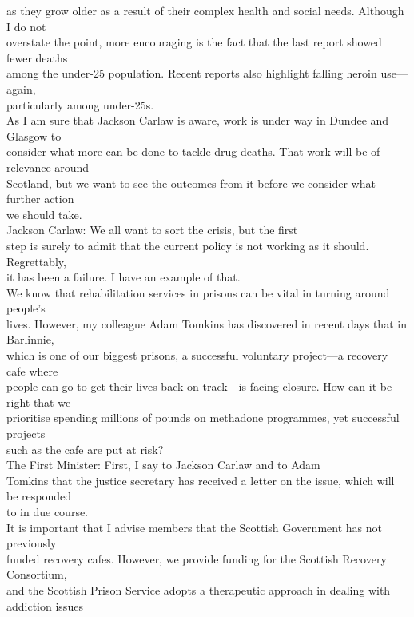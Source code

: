 \documentclass{article}
\begin{document}
\begin{description}
{as they grow older as a result of their complex health and social needs. Although I do not\\
overstate the point, more encouraging is the fact that the last report showed fewer deaths\\
among the under-25 population. Recent reports also highlight falling heroin use—again,\\
particularly among under-25s.\\
As I am sure that Jackson Carlaw is aware, work is under way in Dundee and Glasgow to\\
consider what more can be done to tackle drug deaths. That work will be of relevance around\\
Scotland, but we want to see the outcomes from it before we consider what further action\\
we should take.\\
Jackson Carlaw: We all want to sort the crisis, but the first\\
step is surely to admit that the current policy is not working as it should. Regrettably,\\
it has been a failure. I have an example of that.\\
We know that rehabilitation services in prisons can be vital in turning around people’s\\
lives. However, my colleague Adam Tomkins has discovered in recent days that in Barlinnie,\\
which is one of our biggest prisons, a successful voluntary project—a recovery cafe where\\
people can go to get their lives back on track—is facing closure. How can it be right that we\\
prioritise spending millions of pounds on methadone programmes, yet successful projects\\
such as the cafe are put at risk?\\
The First Minister: First, I say to Jackson Carlaw and to Adam\\
Tomkins that the justice secretary has received a letter on the issue, which will be responded\\
to in due course.\\
It is important that I advise members that the Scottish Government has not previously\\
funded recovery cafes. However, we provide funding for the Scottish Recovery Consortium,\\
and the Scottish Prison Service adopts a therapeutic approach in dealing with addiction issues\\
}
\end{description}
\end{document}
